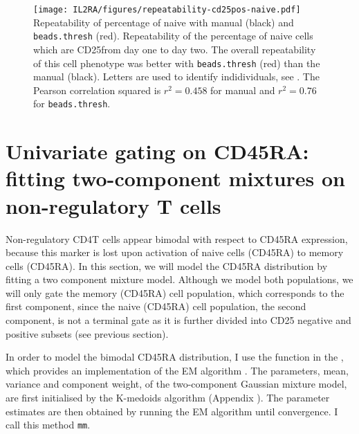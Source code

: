 \begin{figure}[h]
\centering
\texttt{[image: IL2RA/figures/repeatability-cd25pos-naive.pdf]}
{ Repeatability of percentage of naive \positive with manual (black) and \texttt{beads.thresh} (red). }
{
Repeatability of the percentage of naive cells which are CD25\positive from day one to day two.
The overall repeatability of this cell phenotype was better with \texttt{beads.thresh} (red)
than the manual (black).
Letters are used to identify indidividuals, see .
The Pearson correlation squared is $r^2=0.458$ for manual and $r^2=0.76$ for \texttt{beads.thresh}.
}
\end{figure}

\clearpage

\section{Univariate gating on CD45RA: fitting two-component mixtures on non-regulatory T cells}

Non-regulatory CD4\positive T cells appear bimodal with respect to CD45RA expression,
because this marker is lost upon activation of naive cells (CD45RA\positive) to memory cells (CD45RA\negative).
In this section, we will model the CD45RA distribution by fitting a two component mixture model.
Although we model both populations, we will only gate the memory (CD45RA\negative) cell population, which corresponds to the first component,
since the naive (CD45RA\positive) cell population, the second component, is not a terminal gate as
it is further divided into CD25 negative and positive subsets (see previous section).


In order to model the bimodal CD45RA distribution, I use the  function in the ,
which provides an implementation of the \Gls{EM} algorithm \citep{Dempster:1977ul}.
The parameters, mean, variance and component weight, of the two-component Gaussian mixture model,
are first initialised by the K-medoids algorithm (Appendix ).
The parameter estimates are then obtained  by running the EM algorithm until convergence.
I call this method \texttt{mm}.

